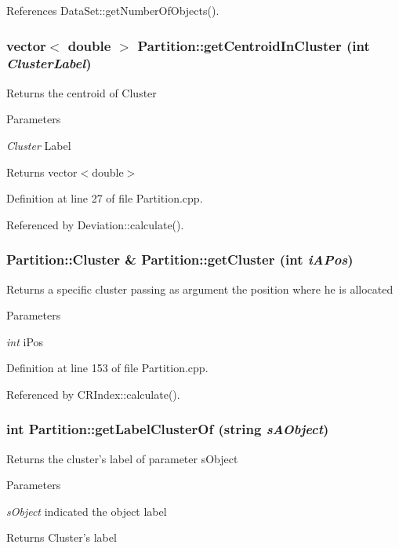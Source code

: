References DataSet::getNumberOfObjects().\hypertarget{classPartition_ab2e66cdee06952b1d1417abedc1b86cc}{
\subsubsection[{getCentroidInCluster}]{\setlength{\rightskip}{0pt plus 5cm}vector$<$ double $>$ Partition::getCentroidInCluster (int {\em ClusterLabel})}}
\label{classPartition_ab2e66cdee06952b1d1417abedc1b86cc}
Returns the centroid of Cluster 
\begin{DoxyParams}{Parameters}
\item[{\em Cluster}]Label \end{DoxyParams}
\begin{DoxyReturn}{Returns}
vector$<$double$>$ 
\end{DoxyReturn}


Definition at line 27 of file Partition.cpp.

Referenced by Deviation::calculate().\hypertarget{classPartition_ac2382e6bd161f3dc1f3cb6cc2d4a42f2}{
\subsubsection[{getCluster}]{\setlength{\rightskip}{0pt plus 5cm}Partition::Cluster \& Partition::getCluster (int {\em iAPos})}}
\label{classPartition_ac2382e6bd161f3dc1f3cb6cc2d4a42f2}
Returns a specific cluster passing as argument the position where he is allocated 
\begin{DoxyParams}{Parameters}
\item[{\em int}]iPos \end{DoxyParams}


Definition at line 153 of file Partition.cpp.

Referenced by CRIndex::calculate().\hypertarget{classPartition_a5c0dc502d21ecd15279ace3e9cf05cb2}{
\subsubsection[{getLabelClusterOf}]{\setlength{\rightskip}{0pt plus 5cm}int Partition::getLabelClusterOf (string {\em sAObject})}}
\label{classPartition_a5c0dc502d21ecd15279ace3e9cf05cb2}
Returns the cluster's label of parameter sObject 
\begin{DoxyParams}{Parameters}
\item[{\em sObject}]indicated the object label \end{DoxyParams}
\begin{DoxyReturn}{Returns}
Cluster's label 
\end{DoxyReturn}


